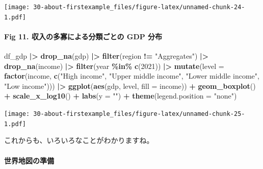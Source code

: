 \documentclass[
  xelatex, ja=standard]{bxjsbook}
\newenvironment{Shaded}{\begin{snugshade}}{\end{snugshade}}
\newcommand{\AttributeTok}[1]{\textcolor[rgb]{0.13,0.29,0.53}{#1}}
\newcommand{\DecValTok}[1]{\textcolor[rgb]{0.00,0.00,0.81}{#1}}
\newcommand{\FunctionTok}[1]{\textcolor[rgb]{0.13,0.29,0.53}{\textbf{#1}}}
\newcommand{\NormalTok}[1]{#1}
\newcommand{\SpecialCharTok}[1]{\textcolor[rgb]{0.81,0.36,0.00}{\textbf{#1}}}
\newcommand{\StringTok}[1]{\textcolor[rgb]{0.31,0.60,0.02}{#1}}
\theoremstyle{definition}
\theoremstyle{definition}
\theoremstyle{definition}
\theoremstyle{definition}
\theoremstyle{remark}
\begin{document}
\texttt{[image: 30-about-firstexample\_files/figure-latex/unnamed-chunk-24-1.pdf]}

\hypertarget{fig-11.-ux53ceux5165ux306eux591aux5be1ux306bux3088ux308bux5206ux985eux3054ux3068ux306e-gdp-ux5206ux5e03-1}{%
\paragraph{Fig 11. 収入の多寡による分類ごとの GDP 分布}\label{fig-11.-ux53ceux5165ux306eux591aux5be1ux306bux3088ux308bux5206ux985eux3054ux3068ux306e-gdp-ux5206ux5e03-1}}

\begin{Shaded}
\begin{Highlighting}[]
\NormalTok{df\_gdp }\SpecialCharTok{|\textgreater{}} \FunctionTok{drop\_na}\NormalTok{(gdp) }\SpecialCharTok{|\textgreater{}} \FunctionTok{filter}\NormalTok{(region }\SpecialCharTok{!=} \StringTok{"Aggregates"}\NormalTok{) }\SpecialCharTok{|\textgreater{}}
  \FunctionTok{drop\_na}\NormalTok{(income) }\SpecialCharTok{|\textgreater{}} \FunctionTok{filter}\NormalTok{(year }\SpecialCharTok{\%in\%} \FunctionTok{c}\NormalTok{(}\DecValTok{2021}\NormalTok{)) }\SpecialCharTok{|\textgreater{}}
  \FunctionTok{mutate}\NormalTok{(}\AttributeTok{level =} \FunctionTok{factor}\NormalTok{(income, }\FunctionTok{c}\NormalTok{(}\StringTok{"High income"}\NormalTok{, }\StringTok{"Upper middle income"}\NormalTok{, }\StringTok{"Lower middle income"}\NormalTok{, }\StringTok{"Low income"}\NormalTok{))) }\SpecialCharTok{|\textgreater{}}
  \FunctionTok{ggplot}\NormalTok{(}\FunctionTok{aes}\NormalTok{(gdp, level, }\AttributeTok{fill =}\NormalTok{ income)) }\SpecialCharTok{+} 
  \FunctionTok{geom\_boxplot}\NormalTok{() }\SpecialCharTok{+} \FunctionTok{scale\_x\_log10}\NormalTok{() }\SpecialCharTok{+} \FunctionTok{labs}\NormalTok{(}\AttributeTok{y =} \StringTok{""}\NormalTok{) }\SpecialCharTok{+} 
  \FunctionTok{theme}\NormalTok{(}\AttributeTok{legend.position =} \StringTok{"none"}\NormalTok{)}
\end{Highlighting}
\end{Shaded}

\texttt{[image: 30-about-firstexample\_files/figure-latex/unnamed-chunk-25-1.pdf]}

これからも、いろいろなことがわかりますね。

\hypertarget{ux4e16ux754cux5730ux56f3ux306eux6e96ux5099-1}{%
\paragraph{世界地図の準備}\label{ux4e16ux754cux5730ux56f3ux306eux6e96ux5099-1}}
\end{document}
